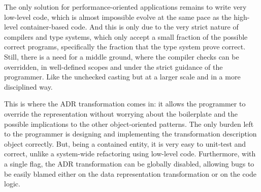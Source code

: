 The only solution for performance-oriented applications remains to write very low-level code, which is almost impossible evolve at the same pace as the high-level container-based code. And this is only due to the very strict nature of compilers and type systems, which only accept a small fraction of the possible correct programs, specifically the fraction that the type system prove correct. Still, there is a need for a middle ground, where the compiler checks can be overridden, in well-defined scopes and under the strict guidance of the programmer. Like the unchecked casting but at a larger scale and in a more disciplined way.

This is where the ADR transformation comes in: it allows the programmer to override the representation without worrying about the boilerplate and the possible implications to the other object-oriented patterns. The only burden left to the programmer is designing and implementing the transformation description object correctly. But, being a contained entity, it is very easy to unit-test and correct, unlike a system-wide refactoring using low-level code. Furthermore, with a single flag, the ADR transformation can be globally disabled, allowing bugs to be easily blamed either on the data representation transformation or on the code logic.
